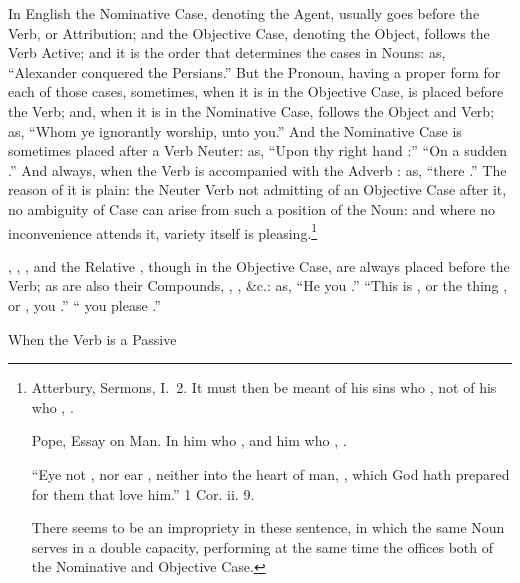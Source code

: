 In English the Nominative Case, denoting the Agent, usually goes before
the Verb, or Attribution; and the Objective Case, denoting the Object,
follows the Verb Active; and it is the order that determines the cases
in Nouns: as, ``Alexander conquered the Persians.'' But the Pronoun,
having a proper form for each of those cases, sometimes, when it is in
the Objective Case, is placed before the Verb; and, when it is in the
Nominative Case, follows the Object and Verb; as, ``Whom ye ignorantly
worship,  unto you.'' And the Nominative Case is
sometimes placed after a Verb Neuter: as, ``Upon thy right hand :'' ``On a sudden .'' And
always, when the Verb is accompanied with the Adverb : as,
``there .'' The reason of it is plain: the Neuter Verb not
admitting of an Objective Case after it, no ambiguity of Case can arise
from such a position of the Noun: and where no inconvenience attends it,
variety itself is pleasing.\footnote{
  \begin{aquote}{Atterbury, Sermons, I.\ 2.}
    It must then be meant of his sins who , not of his who
    , .
  \end{aquote}

  \begin{aquote}{Pope, Essay on Man.}
    In him who , and him who , .
  \end{aquote}

  ``Eye  not , nor ear , neither  into the heart of man, , which God hath
  prepared for them that love him.'' 1 Cor. ii. 9.

  There seems to be an impropriety in these sentence, in which the same
  Noun serves in a double capacity, performing at the same time the
  offices both of the Nominative and Objective Case.}

, , , and the Relative , though in
the Objective Case, are always placed before the Verb; as are also their
Compounds, , , \&c.: as, ``He  you
.'' ``This is , or the thing , or ,
you .'' `` you please .''

When the Verb is a Passive
